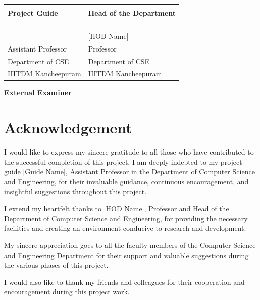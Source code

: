 \documentclass[12pt,a4paper]{report}
\begin{document}
\vspace{2cm}

\begin{tabular}{ll}
    \hspace{2cm} & \hspace{8cm} \\
    \textbf{Project Guide} & \textbf{Head of the Department}\\
    & \\
    & \\
    & \\
    & \\
    [Guide Name] & [HOD Name]\\
    Assistant Professor & Professor\\
    Department of CSE & Department of CSE\\
    IIITDM Kancheepuram & IIITDM Kancheepuram
\end{tabular}

\vspace{2cm}

\begin{center}
    \textbf{External Examiner}
\end{center}

\chapter*{Acknowledgement}

I would like to express my sincere gratitude to all those who have contributed to the successful completion of this project. I am deeply indebted to my project guide [Guide Name], Assistant Professor in the Department of Computer Science and Engineering, for their invaluable guidance, continuous encouragement, and insightful suggestions throughout this project.

I extend my heartfelt thanks to [HOD Name], Professor and Head of the Department of Computer Science and Engineering, for providing the necessary facilities and creating an environment conducive to research and development.

My sincere appreciation goes to all the faculty members of the Computer Science and Engineering Department for their support and valuable suggestions during the various phases of this project.

I would also like to thank my friends and colleagues for their cooperation and encouragement during this project work.
\end{document}
